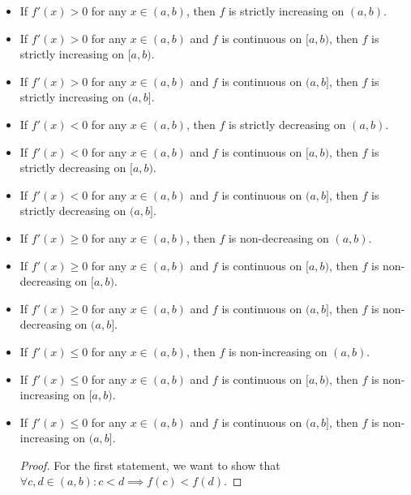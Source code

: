 \documentclass[a4paper,12pt]{report}
\begin{document}
\begin{itemize}
\begin{itemize}
If $f'(x)\geq g'(x)$ for all $x\in (a,b)$ with $b\in\bbR_{>a}\cup\{\infty\}$, $f$ is continuous on $(a,b]$, and $f(a)=g(a)$, then $f(x)\geq g(x)$ for all $x\in(a,b]$.
\begin{proof}
    For the first and second statements, define a function
    \[h(x)=f(x)-g(x).\]
    \[h'(x)=f'(x)-g'(x)>0,\quad\forall x\in(a,b).\]
    \[h(a)=f(a)-g(a)=0.\]
    By MVT, for all $x\in(a,b)$ for the first statement and $x\in(a,b]$ for the second statement, there exists $c\in(a,x)$ such that
    \[\frac{h(x)-h(a)}{x-a}=h'(c)>0.\]
    \[f(x)-g(x)=h(x)=(x-a)h'(c)>0.\]
    The other statements can be proven similarly.
\end{proof}
Let $f\colon I\subseteq\mathbb{R}\to\mathbb{R}$ be function.
\bit
\item If $f'(x)>0$ for any $x\in (a,b)$, then $f$ is strictly increasing on $(a,b)$.
\item If $f'(x)>0$ for any $x\in (a,b)$ and $f$ is continuous on $[a,b)$, then $f$ is strictly increasing on $[a,b)$.
\item If $f'(x)>0$ for any $x\in (a,b)$ and $f$ is continuous on $(a,b]$, then $f$ is strictly increasing on $(a,b]$.
\item If $f'(x)<0$ for any $x\in (a,b)$, then $f$ is strictly decreasing on $(a,b)$.
\item If $f'(x)<0$ for any $x\in (a,b)$ and $f$ is continuous on $[a,b)$, then $f$ is strictly decreasing on $[a,b)$.
\item If $f'(x)<0$ for any $x\in (a,b)$ and $f$ is continuous on $(a,b]$, then $f$ is strictly decreasing on $(a,b]$.
\item If $f'(x)\geq 0$ for any $x\in (a,b)$, then $f$ is non-decreasing on $(a,b)$.
\item If $f'(x)\geq 0$ for any $x\in (a,b)$ and $f$ is continuous on $[a,b)$, then $f$ is non-decreasing on $[a,b)$.
\item If $f'(x)\geq 0$ for any $x\in (a,b)$ and $f$ is continuous on $(a,b]$, then $f$ is non-decreasing on $(a,b]$.
\item If $f'(x)\leq 0$ for any $x\in (a,b)$, then $f$ is non-increasing on $(a,b)$.
\item If $f'(x)\leq 0$ for any $x\in (a,b)$ and $f$ is continuous on $[a,b)$, then $f$ is non-increasing on $[a,b)$.
\item If $f'(x)\leq 0$ for any $x\in (a,b)$ and $f$ is continuous on $(a,b]$, then $f$ is non-increasing on $(a,b]$.
\eit
\begin{proof}
    For the first statement, we want to show that $\forall c,d\in (a,b)\colon c<d\implies f(c)<f(d)$.


\end{proof}
\end{itemize}
\end{itemize}
\end{document}
